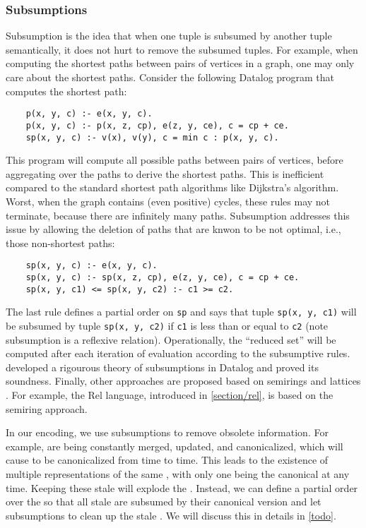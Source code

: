 \subsubsection*{Subsumptions}
Subsumption \citep{datalog-subsumption} is the idea that
 when one tuple is subsumed by another tuple semantically,
 it does not hurt to remove the subsumed tuples.
For example, 
 when computing the shortest paths between pairs of vertices in a graph,
 one may only care about the shortest paths. 
Consider the following Datalog program that computes the shortest path:
\begin{verbatim}
    p(x, y, c) :- e(x, y, c).
    p(x, y, c) :- p(x, z, cp), e(z, y, ce), c = cp + ce.
    sp(x, y, c) :- v(x), v(y), c = min c : p(x, y, c).
\end{verbatim}
This program will compute all possible paths between pairs of vertices,
 before aggregating over the paths to derive the shortest paths.
This is inefficient compared to the standard shortest path algorithms 
 like Dijkstra's algorithm.
Worst, when the graph contains (even positive) cycles, 
 these rules may not terminate, 
 because there are infinitely many paths.
Subsumption addresses this issue 
 by allowing the deletion of paths that are knwon to be not optimal,
 i.e., those non-shortest paths:
\begin{verbatim}
    sp(x, y, c) :- e(x, y, c).
    sp(x, y, c) :- sp(x, z, cp), e(z, y, ce), c = cp + ce.
    sp(x, y, c1) <= sp(x, y, c2) :- c1 >= c2.
\end{verbatim}
The last rule defines a partial order on
 \verb|sp| and says that tuple \verb|sp(x, y, c1)| 
 will be subsumed by tuple \verb|sp(x, y, c2)| if
 \verb|c1| is less than or equal to \verb|c2| 
 (note subsumption is a reflexive relation).
Operationally,
 the ``reduced set'' will be computed 
 after each iteration of evaluation according to
 the subsumptive rules.
\citet{datalog-subsumption} developed 
 a rigourous theory of subsumptions in Datalog
 and proved its soundness.
Finally,
 other approaches are proposed based on 
 semirings \citep{datalogo,datalogo-convergence}
 and lattices \citep{flix}.
For example, the Rel language,
 introduced in \autoref{section/rel},
 is based on the semiring approach.

In our encoding, we use subsumptions 
 to remove obsolete information.
For example,
 \eclasses are being constantly merged, updated, and canonicalized,
 which will cause \enodes to be canonicalized from time to time.
This leads to the existence of multiple representations of
 the same \enode, with only one being the canonical at any time.
Keeping these stale \enodes will explode the \egraph.
Instead,
 we can define a partial order over the \egraphs
 so that all stale \enodes are subsumed 
 by their canonical version and 
 let subsumptions to clean up the stale \enodes.
We will discuss this in details in \autoref{todo}.
 
